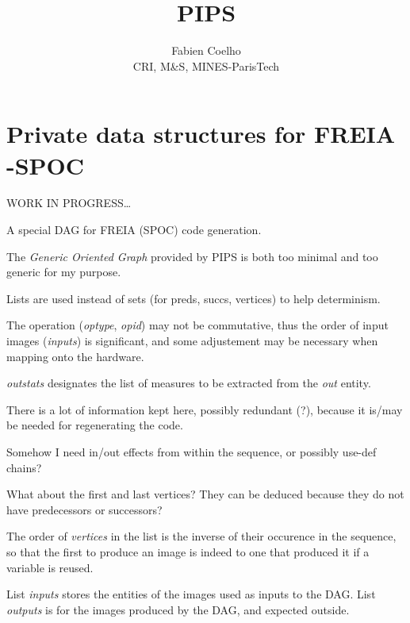 \documentclass[a4paper,11pt]{article}
\title{PIPS}
\author{Fabien Coelho \\
CRI, M\&S, MINES-ParisTech}
\begin{document}
\maketitle

\section{Private data structures for FREIA -SPOC}
\label{sec:freia-spoc}

WORK IN PROGRESS\ldots

A special DAG for FREIA (SPOC) code generation.

The \emph{Generic Oriented Graph} provided by PIPS is both too minimal
and too generic for my purpose.

Lists are used instead of sets (for preds, succs, vertices) to help
determinism.

{}

{}

{}

{}

The operation (\emph{optype}, \emph{opid}) may not be commutative,
thus the order of input images (\emph{inputs}) is significant, and some
adjustement may be necessary when mapping onto the hardware.

\emph{outstats} designates the list of measures to be extracted from
the \emph{out} entity.

There is a lot of information kept here, possibly redundant (?), because
it is/may be needed for regenerating the code.

Somehow I need in/out effects from within the sequence, or possibly
use-def chains?

{}

What about the first and last vertices? They can be deduced because
they do not have predecessors or successors?

{}

The order of \emph{vertices} in the list is the inverse of their
occurence in the sequence, so that the first to produce an image is
indeed to one that produced it if a variable is reused.

List \emph{inputs} stores the entities of the images used as inputs to
the DAG. List \emph{outputs} is for the images produced by the DAG, and
expected outside.
\end{document}
